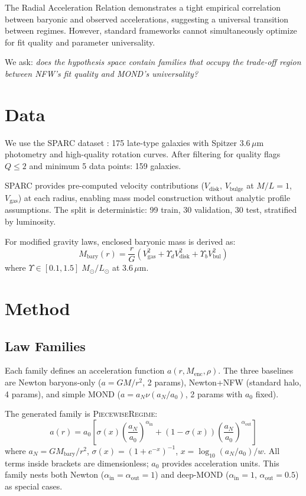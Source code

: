 \documentclass[aps,prl,twocolumn,superscriptaddress,showpacs]{revtex4-2}
\newcommand{\msun}{M_\odot}
\newcommand{\lsun}{L_\odot}
\newcommand{\pr}{\textsc{PiecewiseRegime}}
\begin{document}
The Radial Acceleration Relation \citep[RAR;][]{McGaugh2016,Lelli2017} demonstrates a tight empirical correlation between baryonic and observed accelerations, suggesting a universal transition between regimes. However, standard frameworks cannot simultaneously optimize for fit quality and parameter universality.

We ask: \emph{does the hypothesis space contain families that occupy the trade-off region between NFW's fit quality and MOND's universality?}

\section{Data}\label{sec:data}

We use the SPARC dataset \citep{Lelli2016}: 175 late-type galaxies with Spitzer 3.6\,$\mu$m photometry and high-quality rotation curves. After filtering for quality flags $Q \leq 2$ and minimum 5 data points: 159 galaxies.

SPARC provides pre-computed velocity contributions ($V_\mathrm{disk}$, $V_\mathrm{bulge}$ at $M/L=1$, $V_\mathrm{gas}$) at each radius, enabling mass model construction without analytic profile assumptions. The split is deterministic: 99 train, 30 validation, 30 test, stratified by luminosity.

For modified gravity laws, enclosed baryonic mass is derived as:
\begin{equation}
M_\mathrm{bary}(r) = \frac{r}{G}\left(V_\mathrm{gas}^2 + \Upsilon_d V_\mathrm{disk}^2 + \Upsilon_b V_\mathrm{bul}^2\right)
\end{equation}
where $\Upsilon \in [0.1, 1.5]\;{\msun}/{\lsun}$ at 3.6\,$\mu$m.

\section{Method}\label{sec:method}

\subsection{Law Families}\label{sec:families}

Each family defines an acceleration function $a(r, M_\mathrm{enc}, \rho)$. The three baselines are Newton baryons-only ($a = GM/r^2$, 2 params), Newton+NFW (standard halo, 4 params), and simple MOND ($a = a_N \nu(a_N/a_0)$, 2 params with $a_0$ fixed).

The generated family is \pr{}:
\begin{equation}\label{eq:pr}
a(r) = a_0\!\left[\sigma(x)\left(\frac{a_N}{a_0}\right)^{\!\alpha_\mathrm{in}} \!\!+ (1{-}\sigma(x))\left(\frac{a_N}{a_0}\right)^{\!\alpha_\mathrm{out}}\right]
\end{equation}
where $a_N = GM_\mathrm{bary}/r^2$, $\sigma(x) = (1+e^{-x})^{-1}$, $x = \log_{10}(a_N/a_0)/w$. All terms inside brackets are dimensionless; $a_0$ provides acceleration units. This family nests both Newton ($\alpha_\mathrm{in}=\alpha_\mathrm{out}=1$) and deep-MOND ($\alpha_\mathrm{in}=1$, $\alpha_\mathrm{out}=0.5$) as special cases.
\end{document}
